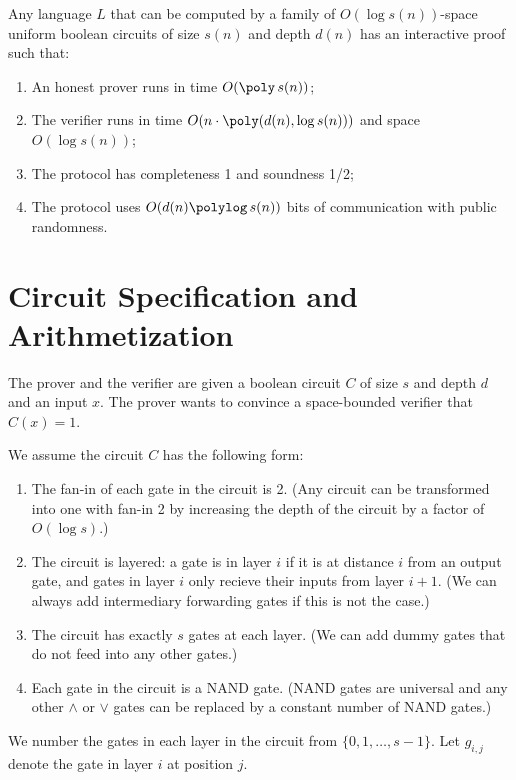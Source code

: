 \begin{theorem}\label{thm:main}
  Any language $L$ that can be computed by a family of $O(\log s(n))$-space
  uniform boolean circuits of size $s(n)$ and depth $d(n)$ has an interactive
  proof such that:
	\begin{enumerate}
		\item An honest prover runs in time $O(\poly\,{s(n)})$;
		\item The verifier runs in time $O(n \cdot \poly(d(n), \log s(n)))$ and space $O(\log s(n))$;
		\item The protocol has completeness 1 and soundness 1/2;
    \item The protocol uses $O(d(n)\polylog\,{s(n)})$ bits of communication with
      public randomness.
  \end{enumerate}
\end{theorem}

\section{Circuit Specification and Arithmetization}

The prover and the verifier are given a boolean circuit $C$ of size $s$ and
depth $d$ and an input $x$. The prover wants to convince a space-bounded
verifier that $C(x) = 1$.

We assume the circuit $C$ has the following form:
\begin{enumerate}
  \item The fan-in of each gate in the circuit is 2. (Any circuit can be
    transformed into one with fan-in 2 by increasing the depth of the circuit
    by a factor of $O(\log s)$.)
  \item The circuit is layered: a gate is in layer $i$ if it is at distance $i$
    from an output gate, and gates in layer $i$ only recieve their inputs from
    layer $i + 1$. (We can always add intermediary forwarding gates if this is
    not the case.)
  \item The circuit has exactly $s$ gates at each layer. (We can add dummy
    gates that do not feed into any other gates.)
  \item Each gate in the circuit is a NAND gate. (NAND gates are universal and
    any other $\wedge$ or $\vee$ gates can be replaced by a constant number of
    NAND gates.)
\end{enumerate}

We number the gates in each layer in the circuit from $\{0,1,\ldots, s-1\}$.
Let $g_{i,j}$ denote the gate in layer $i$ at position $j$.

